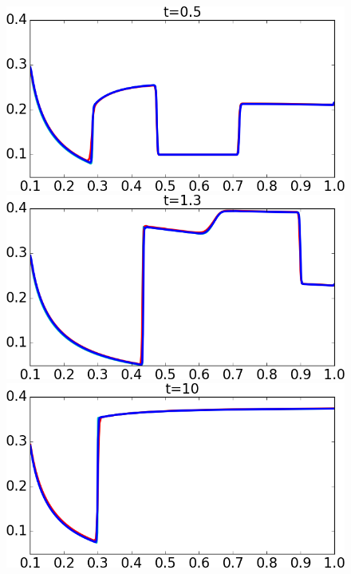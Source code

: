 \documentclass[preprint, 11pt]{article}
\begin{document}
\begin{figure}[!h]
  {\scriptsize
    \includegraphics[scale=0.29]{figures/chj_1D_t0p5.png}
    \qquad
    \includegraphics[scale=0.29]{figures/chj_1D_t1p3.png}
    \qquad
    \includegraphics[scale=0.29]{figures/chj_1D_t10p0.png}

}
\end{figure}
\end{document}
